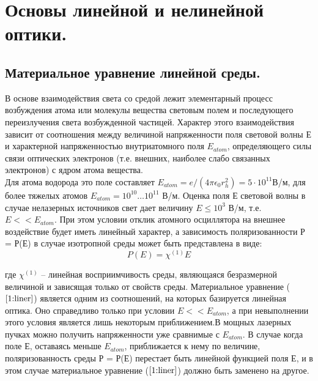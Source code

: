 \section{Основы линейной и нелинейной оптики.}

\subsection{Материальное уравнение линейной среды.}
\hspace*{2mm}В основе взаимодействия света со средой лежит элементарный
процесс возбуждения атома или молекулы вещества световым полем и последующего переизлучения света возбужденной частицей. Характер этого взаимодействия зависит от соотношения между величиной напряженности поля световой волны Е и характерной напряженностью внутриатомного поля $E_{atom}$, определяющего силы связи оптических электронов (т.е. внешних, наиболее слабо связанных электронов) с ядром атома вещества.
\\
\hspace*{2mm}
Для атома водорода это поле составляет $ E_{atom} = e/(4\pi\epsilon_{0}r_{h}^2) = 5\cdot10^{11} $В/м, для более тяжелых атомов $ E_{atom} = 10^{10} \dots 10^{11} $ В/м. Оценка поля Е световой волны в случае нелазерных источников свет дает величину $E \le 10^3$ В/м, т.е. $E<<E_{atom} $. При этом условии отклик атомного осциллятора на внешнее воздействие будет иметь линейный характер, а зависимость поляризованности Р = Р(Е) в случае изотропной среды может быть представлена в виде:
\begin{equation}\label{1:liner}
P(E) = \chi^{(1)}E
\end{equation}

где $ \chi^{(1)}$ – линейная восприимчивость среды, являющаяся безразмерной величиной и зависящая только от свойств среды.
Материальное уравнение ($\ref{1:liner}$) является одним из соотношений, на которых базируется линейная оптика.  Оно справедливо только при условии $E << E_{atom} $, а при невыполнении этого условия является лишь некоторым приближением.В мощных лазерных пучках можно получить напряженности уже сравнимые с $E_{atom} $. В случае когда поле Е, оставаясь меньше $E_{atom} $, приближается к нему по величине, поляризованность среды Р = Р(Е) перестает быть линейной функцией поля Е, и в этом случае материальное уравнение ($\ref{1:liner}$) должно быть заменено на другое.

